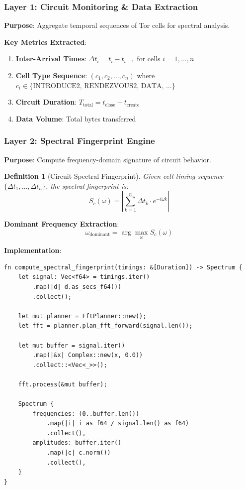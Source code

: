 \documentclass[11pt,a4paper]{article}
\newtheorem{definition}{Definition}[section]
\begin{document}
\subsubsection{Layer 1: Circuit Monitoring \& Data Extraction}

\textbf{Purpose}: Aggregate temporal sequences of Tor cells for spectral analysis.

\textbf{Key Metrics Extracted}:
\begin{enumerate}
\item \textbf{Inter-Arrival Times}: $\Delta t_i = t_i - t_{i-1}$ for cells $i = 1, \ldots, n$
\item \textbf{Cell Type Sequence}: $(c_1, c_2, \ldots, c_n)$ where $c_i \in \{\text{INTRODUCE2, RENDEZVOUS2, DATA, \ldots}\}$
\item \textbf{Circuit Duration}: $T_{\text{total}} = t_{\text{close}} - t_{\text{create}}$
\item \textbf{Data Volume}: Total bytes transferred
\end{enumerate}

\subsubsection{Layer 2: Spectral Fingerprint Engine}

\textbf{Purpose}: Compute frequency-domain signature of circuit behavior.

\begin{definition}[Circuit Spectral Fingerprint]
Given cell timing sequence $\{\Delta t_1, \ldots, \Delta t_n\}$, the spectral fingerprint is:
\begin{equation}
S_c(\omega) = \left| \sum_{k=1}^{n} \Delta t_k \cdot e^{-i \omega k} \right|
\end{equation}
\end{definition}

\textbf{Dominant Frequency Extraction}:
\begin{equation}
\omega_{\text{dominant}} = \arg\max_{\omega} S_c(\omega)
\end{equation}

\textbf{Implementation}:
\begin{lstlisting}[style=rust]
fn compute_spectral_fingerprint(timings: &[Duration]) -> Spectrum {
    let signal: Vec<f64> = timings.iter()
        .map(|d| d.as_secs_f64())
        .collect();
    
    let mut planner = FftPlanner::new();
    let fft = planner.plan_fft_forward(signal.len());
    
    let mut buffer = signal.iter()
        .map(|&x| Complex::new(x, 0.0))
        .collect::<Vec<_>>();
    
    fft.process(&mut buffer);
    
    Spectrum {
        frequencies: (0..buffer.len())
            .map(|i| i as f64 / signal.len() as f64)
            .collect(),
        amplitudes: buffer.iter()
            .map(|c| c.norm())
            .collect(),
    }
}
\end{lstlisting}
\end{document}
